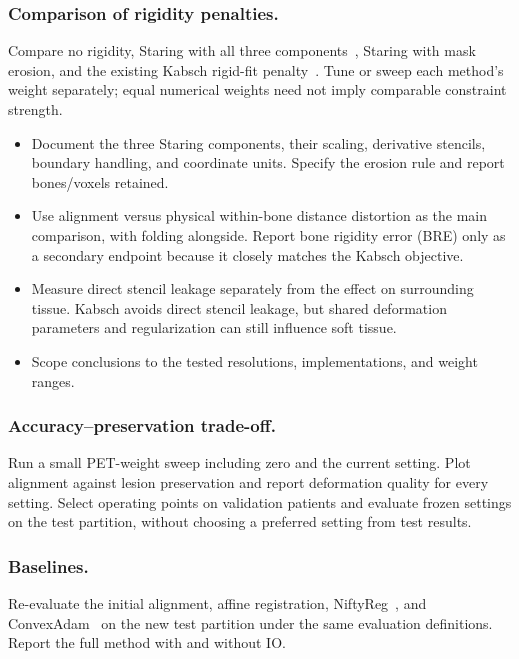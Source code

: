 \begin{journaladdition}
\subsubsection{Comparison of rigidity penalties.}
Compare no rigidity, Staring with all three components~\cite{ref_rigidity_3_staring}, Staring with mask erosion, and the existing Kabsch rigid-fit penalty~\cite{ref_kabsch}.
Tune or sweep each method's weight separately; equal numerical weights need not imply comparable constraint strength.
\begin{itemize}
  \item Document the three Staring components, their scaling, derivative stencils, boundary handling, and coordinate units. Specify the erosion rule and report bones/voxels retained.
  \item Use alignment versus physical within-bone distance distortion as the main comparison, with folding alongside. Report bone rigidity error (BRE) only as a secondary endpoint because it closely matches the Kabsch objective.
  \item Measure direct stencil leakage separately from the effect on surrounding tissue. Kabsch avoids direct stencil leakage, but shared deformation parameters and regularization can still influence soft tissue.
  \item Scope conclusions to the tested resolutions, implementations, and weight ranges.
\end{itemize}

\subsubsection{Accuracy--preservation trade-off.}
Run a small PET-weight sweep including zero and the current setting.
Plot alignment against lesion preservation and report deformation quality for every setting.
Select operating points on validation patients and evaluate frozen settings on the test partition, without choosing a preferred setting from test results.

\subsubsection{Baselines.}
\label{sec:baselines}
Re-evaluate the initial alignment, affine registration, NiftyReg~\cite{MODAT2010,modat2014}, and ConvexAdam~\cite{ref_convexadam} on the new test partition under the same evaluation definitions.
Report the full method with and without IO.


\end{journaladdition}
